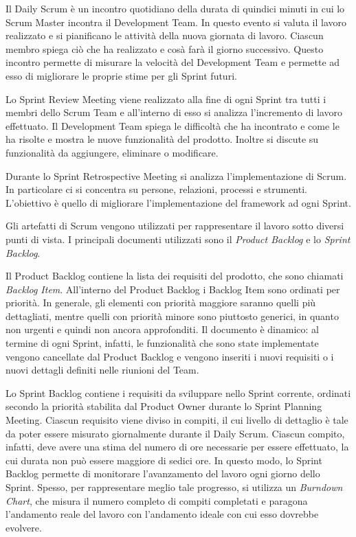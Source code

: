 			Il Daily Scrum è un incontro quotidiano della durata di quindici minuti in cui lo Scrum Master incontra il Development Team. 
			In questo evento si valuta il lavoro realizzato e si pianificano le attività della nuova giornata di lavoro.
			Ciascun membro spiega ciò che ha realizzato e cosà farà il giorno successivo.
			Questo incontro permette di misurare la velocità del Development Team e permette ad esso di migliorare le proprie stime per gli Sprint futuri.
			
			Lo Sprint Review Meeting viene realizzato alla fine di ogni Sprint tra tutti i membri dello Scrum Team e all'interno di esso si analizza l'incremento di lavoro effettuato.
			Il Development Team spiega le difficoltà che ha incontrato e come le ha risolte e mostra le nuove funzionalità del prodotto.
			Inoltre si discute su funzionalità da aggiungere, eliminare o modificare.

			Durante lo Sprint Retrospective Meeting si analizza l'implementazione di Scrum. 
			In particolare ci si concentra su persone, relazioni, processi e strumenti.
			L'obiettivo è quello di migliorare l'implementazione del framework ad ogni Sprint.

			Gli artefatti di Scrum vengono utilizzati per rappresentare il lavoro sotto diversi punti di vista.
			I principali documenti utilizzati sono il \emph{Product Backlog} e lo \emph{Sprint Backlog}.
			
			Il Product Backlog contiene la lista dei requisiti del prodotto, che sono chiamati \emph{Backlog Item}.
			All'interno del Product Backlog i Backlog Item sono ordinati per priorità.
			In generale, gli elementi con priorità maggiore saranno quelli più dettagliati, mentre quelli con priorità minore sono  piuttosto generici, in quanto non urgenti e quindi non ancora approfonditi.
			Il documento è dinamico: al termine di ogni Sprint, infatti, le funzionalità che sono state implementate vengono cancellate dal Product Backlog e vengono inseriti i nuovi requisiti o i nuovi dettagli definiti nelle riunioni del Team.

			Lo Sprint Backlog contiene i requisiti da sviluppare nello Sprint corrente, ordinati secondo la priorità stabilita dal Product Owner durante lo Sprint Planning Meeting.
			Ciascun requisito viene diviso in compiti, il cui livello di dettaglio è tale da poter essere misurato giornalmente durante il Daily Scrum.
			Ciascun compito, infatti, deve avere una stima del numero di ore necessarie per essere effettuato, la cui durata non può essere maggiore di sedici ore.
			In questo modo, lo Sprint Backlog permette di monitorare l'avanzamento del lavoro ogni giorno dello Sprint.
			Spesso, per rappresentare meglio tale progresso, si utilizza un \emph{Burndown Chart}, che misura il numero completo di compiti completati e paragona l'andamento reale del lavoro con l'andamento ideale con cui esso dovrebbe evolvere.

